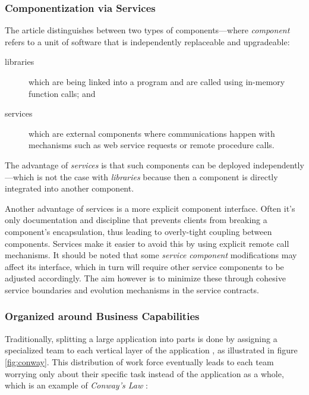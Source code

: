 \subsubsection{Componentization via Services}
\label{sec:componentization}

The article \cite{ms-definition} distinguishes between two types of
components---where \textit{component} refers to a unit of software
that is independently replaceable and upgradeable:

\begin{description}
	\item[libraries] which are being linked into a program and are
		called using in-memory function calls; and
	\item[services] which are external components where communications
		happen with mechanisms such as web service requests or remote
		procedure calls.
\end{description}

The advantage of \textit{services} is that such components can be
deployed independently---which is not the case with \textit{libraries}
because then a component is directly integrated into
another component.

Another advantage of services is a more explicit component interface.
Often it's only documentation and discipline that prevents clients
from breaking a component's encapsulation, thus leading to
overly-tight coupling between components. Services make it easier to
avoid this by using explicit remote call mechanisms.
\cite{ms-definition}
It should be noted that some \textit{service component}
modifications may affect its interface, which in turn will require
other service components to be adjusted accordingly. The aim however
is to minimize these through cohesive service boundaries and evolution
mechanisms in the service contracts. \cite{ms-definition}

\subsubsection{Organized around Business Capabilities}
\label{sec:business-capabilities}

Traditionally, splitting a large application into parts is done by
assigning a specialized team to each vertical layer of the application
\cite{ms-challenges}, as illustrated in figure \ref{fig:conway}. This
distribution of work force eventually leads to each team worrying only
about their specific task instead of the application as a whole, which
is an example of \textit{Conway's Law} \cite{ms-definition}:  

